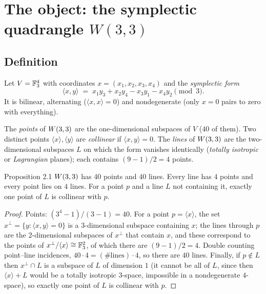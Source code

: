 \section{The object: the symplectic quadrangle \texorpdfstring{$W(3,3)$}{W(3,3)}}
\label{sec:object}

\subsection{Definition}

Let $V=\mathbb{F}_3^4$ with coordinates $x=(x_1,x_2,x_3,x_4)$ and the \emph{symplectic form}
\[
\langle x,y\rangle \;=\; x_1y_3+x_2y_4-x_3y_1-x_4y_2 \pmod 3 .
\]
It is bilinear, alternating ($\langle x,x\rangle=0$) and nondegenerate (only $x=0$ pairs
to zero with everything).

\begin{definition}
The \emph{points} of $W(3,3)$ are the one-dimensional subspaces of $V$ ($40$ of them). Two
distinct points $\langle x\rangle,\langle y\rangle$ are \emph{collinear} if
$\langle x,y\rangle=0$. The \emph{lines} of $W(3,3)$ are the two-dimensional subspaces $L$
on which the form vanishes identically (\emph{totally isotropic} or \emph{Lagrangian}
planes); each contains $(9-1)/2=4$ points.
\end{definition}

\begin{result}{Proposition 2.1 \hfill \tierT}
$W(3,3)$ has $40$ points and $40$ lines. Every line has $4$ points and every point lies on
$4$ lines. For a point $p$ and a line $L$ not containing it, exactly one point of $L$ is
collinear with $p$.
\end{result}

\begin{proof}
Points: $(3^4-1)/(3-1)=40$. For a point $p=\langle x\rangle$, the set
$x^\perp=\{y:\langle x,y\rangle=0\}$ is a $3$-dimensional subspace containing $x$; the
lines through $p$ are the $2$-dimensional subspaces of $x^\perp$ that contain $x$, and
these correspond to the points of $x^\perp/\langle x\rangle\cong\mathbb{F}_3^2$, of which there
are $(9-1)/2=4$. Double counting point--line incidences, $40\cdot4=(\#\text{lines})\cdot4$,
so there are $40$ lines. Finally, if $p\notin L$ then $x^\perp\cap L$ is a subspace of
$L$ of dimension $1$ (it cannot be all of $L$, since then $\langle x\rangle+L$ would be a
totally isotropic $3$-space, impossible in a nondegenerate $4$-space), so exactly one
point of $L$ is collinear with $p$.
\end{proof}

